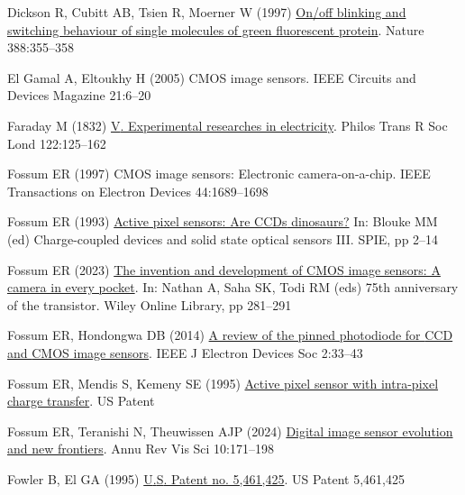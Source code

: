 \documentclass[
  letterpaper,
]{book}
\newlength{\cslhangindent}
\newenvironment{CSLReferences}[2] %
 {\begin{list}{}{%
  \setlength{\itemindent}{0pt}
  \setlength{\leftmargin}{0pt}
  \setlength{\parsep}{0pt}
  \ifodd #1
   \setlength{\leftmargin}{\cslhangindent}
   \setlength{\itemindent}{-1\cslhangindent}
  \fi
  \setlength{\itemsep}{#2\baselineskip}}}
 {\end{list}}
\begin{document}
\begin{CSLReferences}{1}{1}
Dickson R, Cubitt AB, Tsien R, Moerner W (1997)
\href{http://dx.doi.org/10.1038/41048}{On/off blinking and switching
behaviour of single molecules of green fluorescent protein}. Nature
388:355--358

El Gamal A, Eltoukhy H (2005) {CMOS} image sensors. IEEE Circuits and
Devices Magazine 21:6--20

Faraday M (1832) \href{http://dx.doi.org/10.1098/rstl.1832.0006}{{V}.
Experimental researches in electricity}. Philos Trans R Soc Lond
122:125--162

Fossum ER (1997) {CMOS} image sensors: {Electronic} camera-on-a-chip.
IEEE Transactions on Electron Devices 44:1689--1698

Fossum ER (1993)
\href{https://www.spiedigitallibrary.org/conference-proceedings-of-spie/1900/0000/Active-pixel-sensors-are-CCDs-dinosaurs/10.1117/12.148585.short}{Active
pixel sensors: Are {CCDs} dinosaurs?} In: Blouke MM (ed) Charge-coupled
devices and solid state optical sensors III. SPIE, pp 2--14

Fossum ER (2023) \href{http://dx.doi.org/10.1002/9781394202478.ch23}{The
invention and development of {CMOS} image sensors: A camera in every
pocket}. In: Nathan A, Saha SK, Todi RM (eds) 75th anniversary of the
transistor. Wiley Online Library, pp 281--291

Fossum ER, Hondongwa DB (2014)
\href{http://dx.doi.org/10.1109/jeds.2014.2306412}{A review of the
pinned photodiode for {CCD} and {CMOS} image sensors}. IEEE J Electron
Devices Soc 2:33--43

Fossum ER, Mendis S, Kemeny SE (1995)
\href{https://patents.google.com/patent/US5471515A/en}{Active pixel
sensor with intra-pixel charge transfer}. US Patent

Fossum ER, Teranishi N, Theuwissen AJP (2024)
\href{http://dx.doi.org/10.1146/annurev-vision-101322-105538}{Digital
image sensor evolution and new frontiers}. Annu Rev Vis Sci 10:171--198

Fowler B, El GA (1995)
\href{https://patentimages.storage.googleapis.com/5e/23/0b/9905270680ea81/US5461425.pdf}{{U}.{S}.
Patent no. 5,461,425}. US Patent 5,461,425


\end{CSLReferences}
\end{document}
